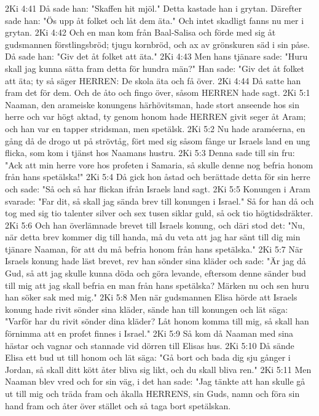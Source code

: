 2Ki 4:41  Då sade han: "Skaffen hit mjöl." Detta kastade han i grytan. Därefter sade han: "Ös upp åt folket och låt dem äta." Och intet skadligt fanns nu mer i grytan.
2Ki 4:42  Och en man kom från Baal-Salisa och förde med sig åt gudsmannen förstlingsbröd; tjugu kornbröd, och ax av grönskuren säd i sin påse. Då sade han: "Giv det åt folket att äta."
2Ki 4:43  Men hans tjänare sade: "Huru skall jag kunna sätta fram detta för hundra män?" Han sade: "Giv det åt folket att äta; ty så säger HERREN: De skola äta och få över.
2Ki 4:44  Då satte han fram det för dem. Och de åto och fingo över, såsom HERREN hade sagt.
2Ki 5:1  Naaman, den arameiske konungens härhövitsman, hade stort anseende hos sin herre och var högt aktad, ty genom honom hade HERREN givit seger åt Aram; och han var en tapper stridsman, men spetälsk.
2Ki 5:2  Nu hade araméerna, en gång då de drogo ut på strövtåg, fört med sig såsom fånge ur Israels land en ung flicka, som kom i tjänst hos Naamans hustru.
2Ki 5:3  Denna sade till sin fru: "Ack att min herre vore hos profeten i Samaria, så skulle denne nog befria honom från hans spetälska!"
2Ki 5:4  Då gick hon åstad och berättade detta för sin herre och sade: "Så och så har flickan ifrån Israels land sagt.
2Ki 5:5  Konungen i Aram svarade: "Far dit, så skall jag sända brev till konungen i Israel." Så for han då och tog med sig tio talenter silver och sex tusen siklar guld, så ock tio högtidsdräkter.
2Ki 5:6  Och han överlämnade brevet till Israels konung, och däri stod det: "Nu, när detta brev kommer dig till handa, må du veta att jag har sänt till dig min tjänare Naaman, för att du må befria honom från hans spetälska."
2Ki 5:7  När Israels konung hade läst brevet, rev han sönder sina kläder och sade: "Är jag då Gud, så att jag skulle kunna döda och göra levande, eftersom denne sänder bud till mig att jag skall befria en man från hans spetälska? Märken nu och sen huru han söker sak med mig."
2Ki 5:8  Men när gudsmannen Elisa hörde att Israels konung hade rivit sönder sina kläder, sände han till konungen och lät säga: "Varför har du rivit sönder dina kläder? Låt honom komma till mig, så skall han förnimma att en profet finnes i Israel."
2Ki 5:9  Så kom då Naaman med sina hästar och vagnar och stannade vid dörren till Elisas hus.
2Ki 5:10  Då sände Elisa ett bud ut till honom och lät säga: "Gå bort och bada dig sju gånger i Jordan, så skall ditt kött åter bliva sig likt, och du skall bliva ren."
2Ki 5:11  Men Naaman blev vred och for sin väg, i det han sade: "Jag tänkte att han skulle gå ut till mig och träda fram och åkalla HERRENS, sin Guds, namn och föra sin hand fram och åter över stället och så taga bort spetälskan.
